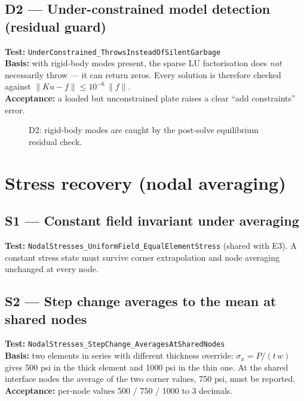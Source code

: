 \documentclass[11pt,a4paper]{article}
\begin{document}
\subsection{D2 --- Under-constrained model detection (residual guard)}
\textbf{Test:} \texttt{UnderConstrained\_ThrowsInsteadOfSilentGarbage}\\
\textbf{Basis:} with rigid-body modes present, the sparse LU factorisation does
\emph{not} necessarily throw --- it can return zeros. Every solution is
therefore checked against $\lVert K u - f \rVert \le 10^{-6}\,\lVert f \rVert$.\\
\textbf{Acceptance:} a loaded but unconstrained plate raises a clear
``add constraints'' error.

\begin{figure}[H]\centering
{}
\caption{D2: rigid-body modes are caught by the post-solve equilibrium residual check.}
\end{figure}

\section{Stress recovery (nodal averaging)}

\subsection{S1 --- Constant field invariant under averaging}
\textbf{Test:} \texttt{NodalStresses\_UniformField\_EqualElementStress}
(shared with E3). A constant stress state must survive corner extrapolation
and node averaging unchanged at every node.

\subsection{S2 --- Step change averages to the mean at shared nodes}
\textbf{Test:} \texttt{NodalStresses\_StepChange\_AveragesAtSharedNodes}\\
\textbf{Basis:} two elements in series with different thickness override:
$\sigma_x = P/(t\,w)$ gives 500 psi in the thick element and 1000 psi in the
thin one. At the shared interface nodes the average of the two corner values,
750 psi, must be reported.\\
\textbf{Acceptance:} per-node values 500 / 750 / 1000 to 3 decimals.
\end{document}
